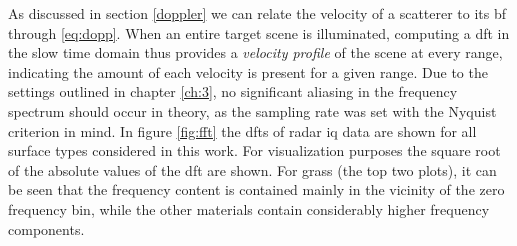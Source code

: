 As discussed in section \ref{doppler} we can relate the velocity of a scatterer to its \gls{bf} through \eqref{eq:dopp}. When an entire target scene is illuminated, computing a \gls{dft} in the slow time domain thus provides a \emph{velocity profile} of the scene at every range, indicating the amount of each velocity is present for a given range. Due to the settings outlined in chapter \ref{ch:3}, no significant aliasing in the frequency spectrum should occur in theory, as the sampling rate was set with the Nyquist criterion in mind. In figure \ref{fig:fft} the \gls{dft}s of radar \gls{iq} data are shown for all surface types considered in this work. For visualization purposes the square root of the absolute values of the \gls{dft} are shown. For grass (the top two plots), it can be seen that the frequency content is contained mainly in the vicinity of the zero frequency bin, while the other materials contain considerably higher frequency components. %





